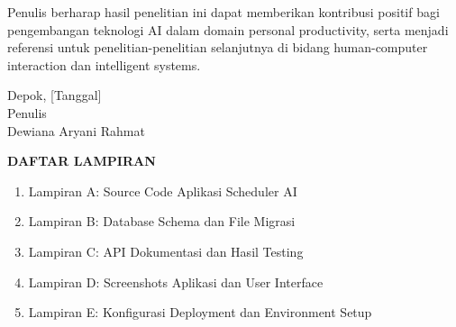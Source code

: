 \documentclass[12pt,a4paper,oneside]{report}
\renewcommand{\headrulewidth}{0pt}
\begin{document}
Penulis berharap hasil penelitian ini dapat memberikan kontribusi positif bagi pengembangan teknologi AI dalam domain personal productivity, serta menjadi referensi untuk penelitian-penelitian selanjutnya di bidang human-computer interaction dan intelligent systems.

\vspace{2cm}

\begin{flushright}
Depok, [Tanggal]\\[2cm]
Penulis\\[1cm]
Dewiana Aryani Rahmat
\end{flushright}

\newpage
\tableofcontents

\newpage
\listoftables

\newpage
\listoffigures

\newpage
{}
\begin{center}
{\Large\bfseries DAFTAR LAMPIRAN}
\end{center}

\vspace{1cm}

\begin{enumerate}
\item Lampiran A: Source Code Aplikasi Scheduler AI
\item Lampiran B: Database Schema dan File Migrasi
\item Lampiran C: API Dokumentasi dan Hasil Testing
\item Lampiran D: Screenshots Aplikasi dan User Interface
\item Lampiran E: Konfigurasi Deployment dan Environment Setup
\end{enumerate}

\newpage
{}
\setcounter{page}{1}

\fancypagestyle{plain}{
  \fancyhf{}
  \fancyfoot[C]{\thepage}
  \renewcommand{\headrulewidth}{0pt}
}
\end{document}
